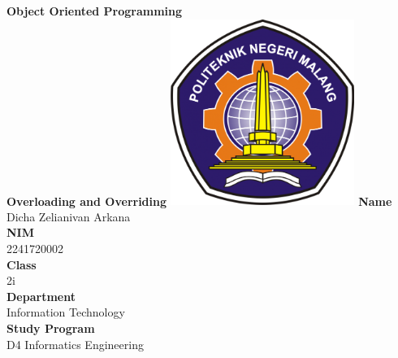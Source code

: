 \documentclass[12pt,titlepage]{article}
\newcommand{\vSubject}{Object Oriented Programming}
\newcommand{\vSubtitle}{Overloading and Overriding}
\newcommand{\vName}{Dicha Zelianivan Arkana}
\newcommand{\vNIM}{2241720002}
\newcommand{\vClass}{2i}
\newcommand{\vDepartment}{Information Technology}
\newcommand{\vStudyProgram}{D4 Informatics Engineering}
\begin{document}
\begin{titlepage}
    \centering
    \vfill
    {\bfseries\LARGE
        \vSubject\\
        \vskip0.25cm
        \vSubtitle
    }
    \vfill
    \includegraphics[width=6cm]{images/polinema-logo.png}
    \vfill
    {
        \textbf{Name}\\
        \vName\\
        \vskip0.5cm
        \textbf{NIM}\\
        \vNIM\\
        \vskip0.5cm
        \textbf{Class}\\
        \vClass\\
        \vskip0.5cm
        \textbf{Department}\\
        \vDepartment\\
        \vskip0.5cm
        \textbf{Study Program}\\
        \vStudyProgram
    }
\end{titlepage}
\end{document}
